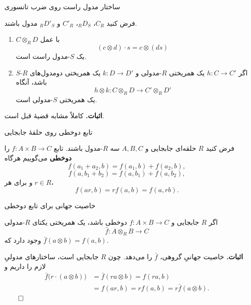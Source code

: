 \begin{frame}[t]{ساختار مدول راست روی ضرب تانسوری}
\label{lec20:right-tensor-action}
\begin{theorem}
فرض کنید \(C_R\)، \({}_R D_S\)، \(C'_R\) و \({}_R D'_S\) مدول باشند.
\begin{enumerate}
\item \(C\otimes_R D\) با عمل
\[
    (c\otimes d)\cdot s=c\otimes(ds)
\]
یک \(S\)-مدول راست است.
\item اگر \(h:C\to C'\) یک همریختی \(R\)-مدولی و
\(k:D\to D'\) یک همریختی دومدول‌های \(R\)-\(S\) باشد، آنگاه
\[
    h\otimes k:C\otimes_R D\longrightarrow C'\otimes_R D'
\]
یک همریختی \(S\)-مدولی است.
\end{enumerate}
\end{theorem}
\textbf{اثبات.} کاملاً مشابه قضیهٔ قبل است.
\end{frame}

\begin{frame}[t]{تابع دوخطی روی حلقهٔ جابجایی}
\label{lec20:bilinear-map}
\begin{definition}
فرض کنید \(R\) حلقه‌ای جابجایی و \(A,B,C\) سه \(R\)-مدول باشند.
تابع \(f:A\times B\to C\) را \textbf{دوخطی} می‌گوییم هرگاه
\[
    f(a_1+a_2,b)=f(a_1,b)+f(a_2,b),
\]
\[
    f(a,b_1+b_2)=f(a,b_1)+f(a,b_2),
\]
و برای هر \(r\in R\)،
\[
    f(ar,b)=r f(a,b)=f(a,rb).
\]
\end{definition}
\end{frame}

\begin{frame}[t]{خاصیت جهانی برای تابع دوخطی}
\label{lec20:linear-universal-property}
\begin{theorem}
اگر \(R\) جابجایی و \(f:A\times B\to C\) دوخطی باشد، یک همریختی یکتای \(R\)-مدولی
\[
    \bar f:A\otimes_R B\longrightarrow C
\]
وجود دارد که \(\bar f(a\otimes b)=f(a,b)\).
\end{theorem}
\textbf{اثبات.} خاصیت جهانیِ گروهی، \(\bar f\) را می‌دهد. چون \(R\) جابجایی است، ساختارهای مدولیِ لازم را داریم و
\[
\begin{aligned}
\bar f\bigl(r\cdot(a\otimes b)\bigr)
 &=\bar f(ra\otimes b)=f(ra,b)\\
 &=f(ar,b)=r f(a,b)=r\bar f(a\otimes b).
\end{aligned}
\]
\hfill\(\qed\)
\end{frame}

